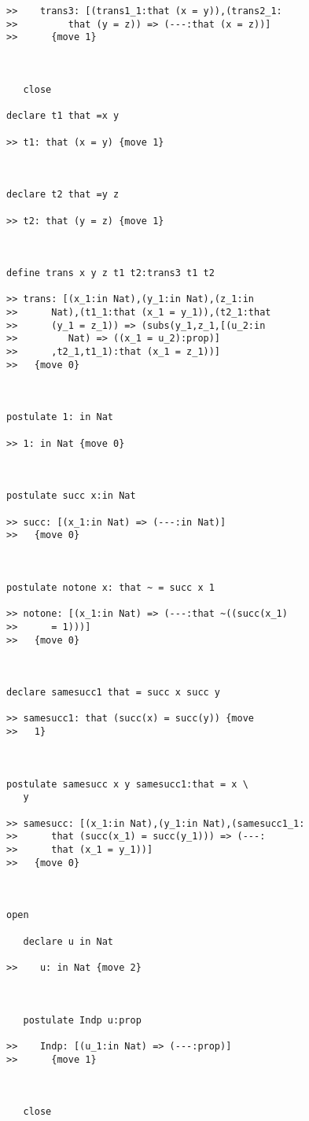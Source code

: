 \begin{verbatim}
>>    trans3: [(trans1_1:that (x = y)),(trans2_1:
>>         that (y = z)) => (---:that (x = z))]
>>      {move 1}



   close

declare t1 that =x y

>> t1: that (x = y) {move 1}



declare t2 that =y z

>> t2: that (y = z) {move 1}



define trans x y z t1 t2:trans3 t1 t2

>> trans: [(x_1:in Nat),(y_1:in Nat),(z_1:in
>>      Nat),(t1_1:that (x_1 = y_1)),(t2_1:that
>>      (y_1 = z_1)) => (subs(y_1,z_1,[(u_2:in
>>         Nat) => ((x_1 = u_2):prop)]
>>      ,t2_1,t1_1):that (x_1 = z_1))]
>>   {move 0}



postulate 1: in Nat

>> 1: in Nat {move 0}



postulate succ x:in Nat

>> succ: [(x_1:in Nat) => (---:in Nat)]
>>   {move 0}



postulate notone x: that ~ = succ x 1

>> notone: [(x_1:in Nat) => (---:that ~((succ(x_1)
>>      = 1)))]
>>   {move 0}



declare samesucc1 that = succ x succ y

>> samesucc1: that (succ(x) = succ(y)) {move
>>   1}



postulate samesucc x y samesucc1:that = x \
   y

>> samesucc: [(x_1:in Nat),(y_1:in Nat),(samesucc1_1:
>>      that (succ(x_1) = succ(y_1))) => (---:
>>      that (x_1 = y_1))]
>>   {move 0}



open

   declare u in Nat

>>    u: in Nat {move 2}



   postulate Indp u:prop

>>    Indp: [(u_1:in Nat) => (---:prop)]
>>      {move 1}



   close


\end{verbatim}
